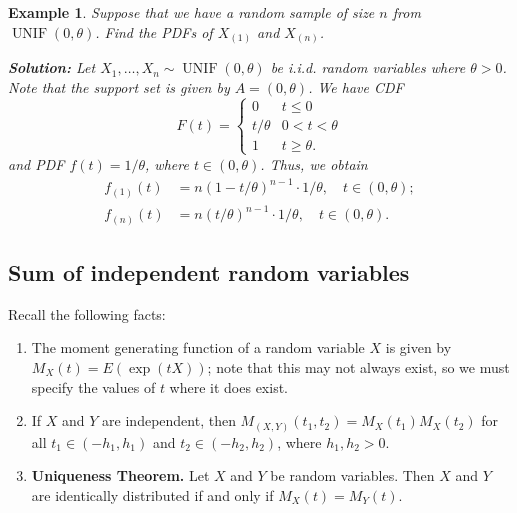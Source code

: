 \documentclass[10pt]{article}
\DeclareMathOperator{\UNIF}{UNIF}
\theoremstyle{newstyle}
\newtheorem{exmp}[thm]{Example}
\begin{document}
\begin{exmp}
Suppose that we have a random sample of size $n$ from $\UNIF(0, \theta)$. Find the PDFs of 
$X_{(1)}$ and $X_{(n)}$. 

{\color{blue}
{\bf Solution:} Let $X_1, \dots, X_n \sim \UNIF(0, \theta)$ be i.i.d. random variables 
where $\theta > 0$. Note that the support set is given by $A = (0, \theta)$. We have CDF 
\[ F(t) = \begin{cases} 0 & t \leq 0 \\ t/\theta & 0 < t < \theta \\ 1 & t \geq \theta. \end{cases} \]
and PDF $f(t) = 1/\theta$, where $t \in (0, \theta)$. Thus, we obtain 
\begin{align*}
    f_{(1)}(t) &= n(1-t/\theta)^{n-1} \cdot 1/\theta, \quad t \in (0, \theta); \\
    f_{(n)}(t) &= n(t/\theta)^{n-1} \cdot 1/\theta, \quad t \in (0, \theta).
\end{align*}}
\end{exmp}

\vspace{-4ex}
\subsection{Sum of independent random variables}

Recall the following facts:
\begin{enumerate}[(1)]
    \item The moment generating function of a random variable $X$ is given by 
    $M_X(t) = E(\exp(tX))$; note that this may not always exist, so we must specify 
    the values of $t$ where it does exist. 
    \item If $X$ and $Y$ are independent, then $M_{(X,Y)}(t_1, t_2) = M_X(t_1) M_X(t_2)$ 
    for all $t_1 \in (-h_1, h_1)$ and $t_2 \in (-h_2, h_2)$, where $h_1, h_2 > 0$.
    \item {\bf Uniqueness Theorem.} Let $X$ and $Y$ be random variables. Then 
    $X$ and $Y$ are identically distributed if and only if $M_X(t) = M_Y(t)$.
\end{enumerate}
\end{document}
